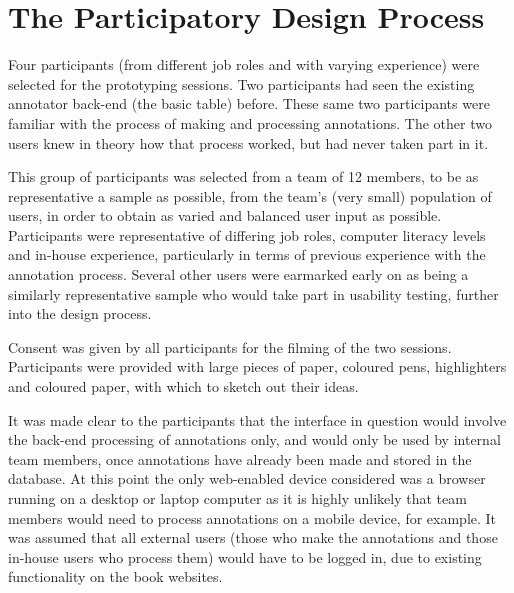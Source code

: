 
\chapter{The Participatory Design Process} %

\label{The Participatory Design Process} %





Four participants (from different job roles and with varying experience) were selected for the prototyping sessions. Two participants had seen the existing annotator back-end (the basic table) before. These same two participants were familiar with the process of making and processing annotations. The other two users knew in theory how that process worked, but had never taken part in it. 

This group of participants was selected from a team of 12 members, to be as representative a sample as possible, from the team's (very small) population of users, in order to obtain as varied and balanced user input as possible. Participants were representative of differing job roles, computer literacy levels and in-house experience, particularly in terms of previous experience with the annotation process. Several other users were earmarked early on as being a similarly representative sample who would take part in usability testing, further into the design process.

Consent was given by all participants for the filming of the two sessions. Participants were provided with large pieces of paper, coloured pens, highlighters and coloured paper, with which to sketch out their ideas. 

It was made clear to the participants that the interface in question would involve the back-end processing of annotations only, and would only be used by internal team members, once annotations have already been made and stored in the database. At this point the only web-enabled device considered was a browser running on a desktop or laptop computer as it is highly unlikely that team members would need to process annotations on a mobile device, for example. It was assumed that all external users (those who make the annotations and those in-house users who process them) would have to be logged in, due to existing functionality on the book websites.

